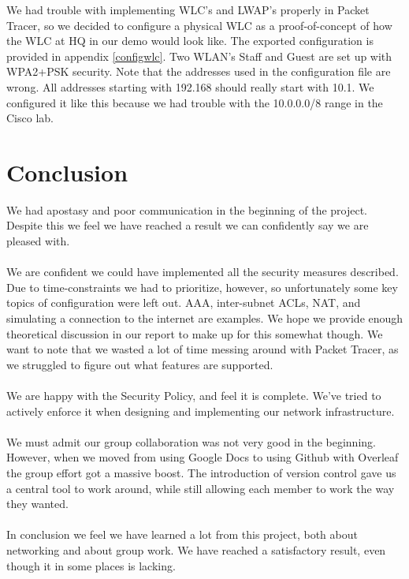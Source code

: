 We had trouble with implementing WLC's and LWAP's properly in Packet Tracer, so we decided to configure a physical WLC as a proof-of-concept of how the WLC at HQ in our demo would look like. The exported configuration is provided in appendix \ref{configwlc}. Two WLAN's Staff and Guest are set up with WPA2+PSK security. Note that the addresses used in the configuration file are wrong. All addresses starting with 192.168 should really start with 10.1. We configured it like this because we had trouble with the 10.0.0.0/8 range in the Cisco lab.

\clearpage

\section{Conclusion}




We had apostasy and poor communication in the beginning of the project. Despite this we feel we have reached a result we can confidently say we are pleased with.  
\\
\\
We are confident we could have implemented all the security measures described. Due to time-constraints we had to prioritize, however, so unfortunately some key topics of configuration were left out. AAA, inter-subnet ACLs, NAT, and simulating a connection to the internet are examples. We hope we provide enough theoretical discussion in our report to make up for this somewhat though. We want to note that we wasted a lot of time messing around with Packet Tracer, as we struggled to figure out what features are supported.
\\
\\
We are happy with the Security Policy, and feel it is complete. We've tried to actively enforce it when designing and implementing our network infrastructure.
\\
\\
We must admit our group collaboration was not very good in the beginning. However, when we moved from using Google Docs to using Github with Overleaf the group effort got a massive boost. The introduction of version control gave us a central tool to work around, while still allowing each member to work the way they wanted.
\\
\\
In conclusion we feel we have learned a lot from this project, both about networking and about group work. We have reached a satisfactory result, even though it in some places is lacking.


